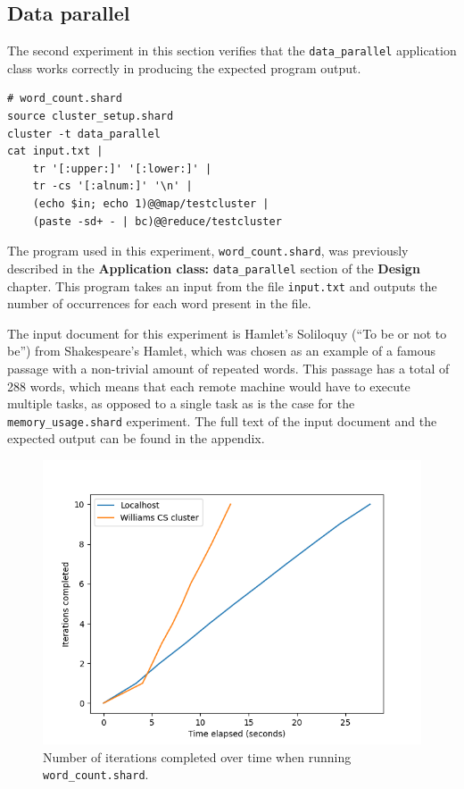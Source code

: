 \documentclass[oneside]{report}
\begin{document}
\subsection{Data parallel}
The second experiment in this section verifies that the \texttt{data\_parallel} application class works correctly in producing the expected program output.

\begin{minipage}[c]{\textwidth-15pt}
  \begin{lstlisting}[language=Shard]
# word_count.shard
source cluster_setup.shard
cluster -t data_parallel
cat input.txt |
    tr '[:upper:]' '[:lower:]' |
    tr -cs '[:alnum:]' '\n' |
    (echo $in; echo 1)@@map/testcluster |
    (paste -sd+ - | bc)@@reduce/testcluster
\end{lstlisting}
  \smallskip
\end{minipage}

The program used in this experiment, \texttt{word\_count.shard}, was previously described in the \textbf{Application class: }\texttt{data\_parallel} section of the \textbf{Design} chapter.
This program takes an input from the file \texttt{input.txt} and outputs the number of occurrences for each word present in the file.

The input document for this experiment is Hamlet's Soliloquy (``To be or not to be'') from Shakespeare's Hamlet, which was chosen as an example of a famous passage with a non-trivial amount of repeated words.
This passage has a total of 288 words, which means that each remote machine would have to execute multiple tasks, as opposed to a single task as is the case for the \texttt{memory\_usage.shard} experiment.
The full text of the input document and the expected output can be found in the appendix.

\begin{figure}[h]
  \begin{center}
    \includegraphics[scale=0.9]{img/experiments/e2_1620960581241.png}
    \caption{Number of iterations completed over time when running \texttt{word\_count.shard}.}
    \label{fig:wordcount}
  \end{center}
\end{figure}
\end{document}
